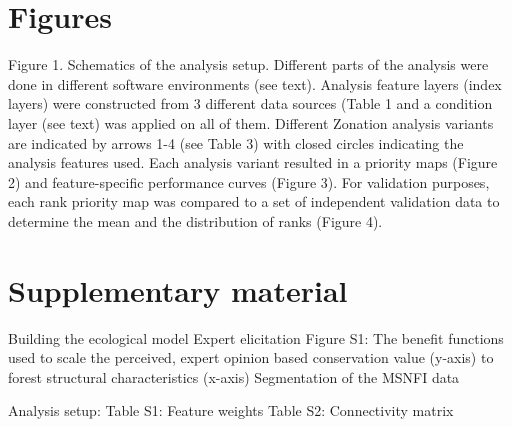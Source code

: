 \documentclass[]{article}
\begin{document}
\section{Figures}

Figure 1. Schematics of the analysis setup. Different parts of the
analysis were done in different software environments (see text).
Analysis feature layers (index layers) were constructed from 3 different
data sources (Table 1 and a condition layer (see text) was applied on
all of them. Different Zonation analysis variants are indicated by
arrows 1-4 (see Table 3) with closed circles indicating the analysis
features used. Each analysis variant resulted in a priority maps (Figure
2) and feature-specific performance curves (Figure 3). For validation
purposes, each rank priority map was compared to a set of independent
validation data to determine the mean and the distribution of ranks
(Figure 4).

\section{Supplementary material}

Building the ecological model Expert elicitation Figure S1: The benefit
functions used to scale the perceived, expert opinion based conservation
value (y-axis) to forest structural characteristics (x-axis)
Segmentation of the MSNFI data

Analysis setup: Table S1: Feature weights Table S2: Connectivity matrix
\end{document}
